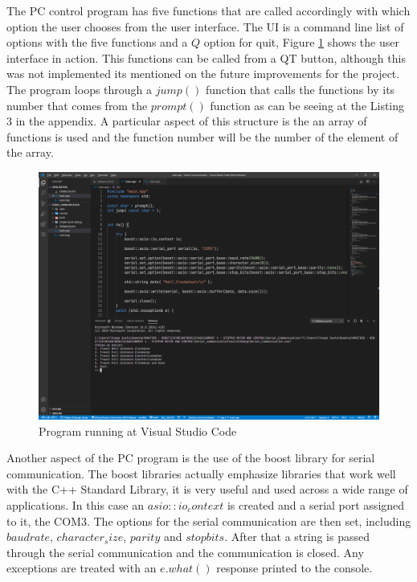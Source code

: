 \documentclass[transmag]{IEEEtran}
\begin{document}
The PC control program has five functions that are called accordingly with which option the user chooses from the user interface. The UI is a command line list of options with the five functions and a $Q$ option for quit, Figure \ref{ASS4-VSCode} shows the user interface in action. This functions can be called from a QT button, although this was not implemented its mentioned on the future improvements for the project. The program loops through a $jump()$ function that calls the functions by its number that comes from the $prompt()$ function as can be seeing at the Listing 3 in the appendix. A particular aspect of this structure is the an array of functions is used and the function number will be the number of the element of the array.


\begin{figure}[h]
\centerline{\includegraphics[width=6in]{./images/ASS4-VSCode}}
\caption{Program running at Visual Studio Code \cite{ref2}\label{ASS4-VSCode}}
\end{figure}

Another aspect of the PC program is the use of the boost library for serial communication. The boost libraries actually emphasize libraries that work well with the C++ Standard Library, it is very useful and used across a wide range of applications. In this case an $asio::io_context$ is created and a serial port assigned to it, the COM3. The options for the serial communication are then set, including $baud rate$, $character_size$, $parity$ and $stop bits$. After that a string is passed through the serial communication and the communication is closed. Any exceptions are treated with an $e.what()$ response printed to the console.
\end{document}
